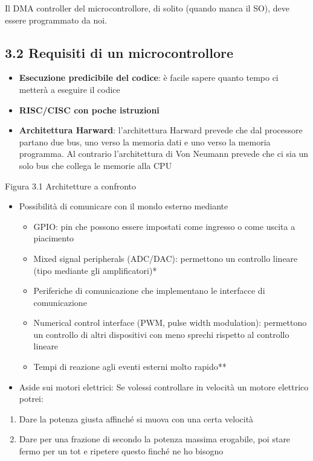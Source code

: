 \documentclass[
]{article}
\providecommand{\tightlist}{%
  \setlength{\itemsep}{0pt}\setlength{\parskip}{0pt}}
\begin{document}
Il DMA controller del microcontrollore, di solito (quando manca il SO),
deve essere programmato da noi.

\subsection{3.2 Requisiti di un
microcontrollore}\label{requisiti-di-un-microcontrollore}

\begin{itemize}
\tightlist
\item
  \textbf{Esecuzione predicibile del codice}: è facile sapere quanto
  tempo ci metterà a eseguire il codice
\item
  \textbf{RISC/CISC con poche istruzioni}
\item
  \textbf{Architettura Harward}: l'architettura Harward prevede che dal
  processore partano due bus, uno verso la memoria dati e uno verso la
  memoria programma. Al contrario l'architettura di Von Neumann prevede
  che ci sia un solo bus che collega le memorie alla CPU
\end{itemize}

Figura 3.1 Architetture a confronto

\begin{itemize}
\tightlist
\item
  Possibilità di comunicare con il mondo esterno mediante

  \begin{itemize}
  \tightlist
  \item
    GPIO: pin che possono essere impostati come ingresso o come uscita a
    piacimento
  \item
    Mixed signal peripherals (ADC/DAC): permettono un controllo lineare
    (tipo mediante gli amplificatori)*
  \item
    Periferiche di comunicazione che implementano le interfacce di
    comunicazione
  \item
    Numerical control interface (PWM, pulse width modulation):
    permettono un controllo di altri dispositivi con meno sprechi
    rispetto al controllo lineare
  \item
    Tempi di reazione agli eventi esterni molto rapido**
  \end{itemize}
\item
  Aside sui motori elettrici: Se volessi controllare in velocità un
  motore elettrico potrei:
\end{itemize}

\begin{enumerate}
\def\labelenumi{\alph{enumi}.}
\tightlist
\item
  Dare la potenza giusta affinché si muova con una certa velocità
\item
  Dare per una frazione di secondo la potenza massima erogabile, poi
  stare fermo per un tot e ripetere questo finché ne ho bisogno
\end{enumerate}
\end{document}
